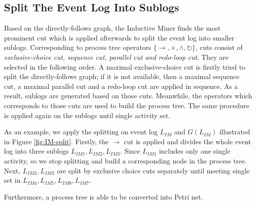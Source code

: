 \subsection{Split The Event Log Into Sublogs}
Based on the directly-follows graph, the Inductive Miner finds the most prominent cut which is applied afterwards to split the event log into smaller sublogs. Corresponding to process tree operators $ \{\rightarrow, \times, \land, \circlearrowright \}$, cuts consist of \emph{exclusive-choice cut, sequence cut, parallel cut and redo-loop cut}. They are selected in the following order. A maximal exclusive-choice cut is firstly tried to split the directly-follows graph; if it is not available, then a maximal sequence cut, a  maximal parallel cut and a redo-loop cut are applied in sequence. As a result, sublogs are generated based on those cuts. Meanwhile, the operators which corresponds to those cuts are used to build the process tree. The same procedure is applied again on the sublogs until single activity set.  

As an example, we apply the splitting on event log $L_{IM}$ and $G(L_{IM})$ illustrated in Figure \ref{fig:IM-split}. Firstly, the $\rightarrow$ cut is applied and divides the whole event log into three sublogs $L_{IM1},L_{IM2},L_{IM3}$. Since $L_{IM1}$ includes only one single activity, so we stop splitting and build a corresponding node in the process tree. Next, $L_{IM2},L_{IM3}$ are split by exclusive choice cuts separately until meeting single set in $L_{IM4},L_{IM5},L_{IM6},L_{IM7}$.

Furthermore, a process tree is able to be converted into Petri net. 
